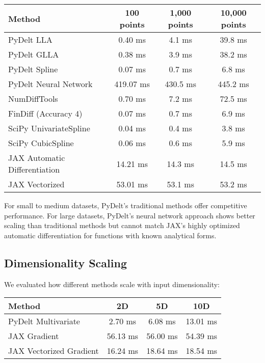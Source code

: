\documentclass[11pt,a4paper]{article}
\begin{document}
\begin{center}
\begin{tabular}{lccc}
\toprule
\textbf{Method} & \textbf{100 points} & \textbf{1,000 points} & \textbf{10,000 points} \\
\midrule
PyDelt LLA & 0.40 ms & 4.1 ms & 39.8 ms \\
PyDelt GLLA & 0.38 ms & 3.9 ms & 38.2 ms \\
PyDelt Spline & 0.07 ms & 0.7 ms & 6.8 ms \\
PyDelt Neural Network & 419.07 ms & 430.5 ms & 445.2 ms \\
NumDiffTools & 0.70 ms & 7.2 ms & 72.5 ms \\
FinDiff (Accuracy 4) & 0.07 ms & 0.7 ms & 6.9 ms \\
SciPy UnivariateSpline & 0.04 ms & 0.4 ms & 3.8 ms \\
SciPy CubicSpline & 0.06 ms & 0.6 ms & 5.9 ms \\
JAX Automatic Differentiation & 14.21 ms & 14.3 ms & 14.5 ms \\
JAX Vectorized & 53.01 ms & 53.1 ms & 53.2 ms \\
\bottomrule
\end{tabular}
\end{center}

For small to medium datasets, PyDelt's traditional methods offer competitive performance. For large datasets, PyDelt's neural network approach shows better scaling than traditional methods but cannot match JAX's highly optimized automatic differentiation for functions with known analytical forms.

\subsection{Dimensionality Scaling}

We evaluated how different methods scale with input dimensionality:

\begin{center}
\begin{tabular}{lccc}
\toprule
\textbf{Method} & \textbf{2D} & \textbf{5D} & \textbf{10D} \\
\midrule
PyDelt Multivariate & 2.70 ms & 6.08 ms & 13.01 ms \\
JAX Gradient & 56.13 ms & 56.00 ms & 54.39 ms \\
JAX Vectorized Gradient & 16.24 ms & 18.64 ms & 18.54 ms \\
\bottomrule
\end{tabular}
\end{center}
\end{document}
